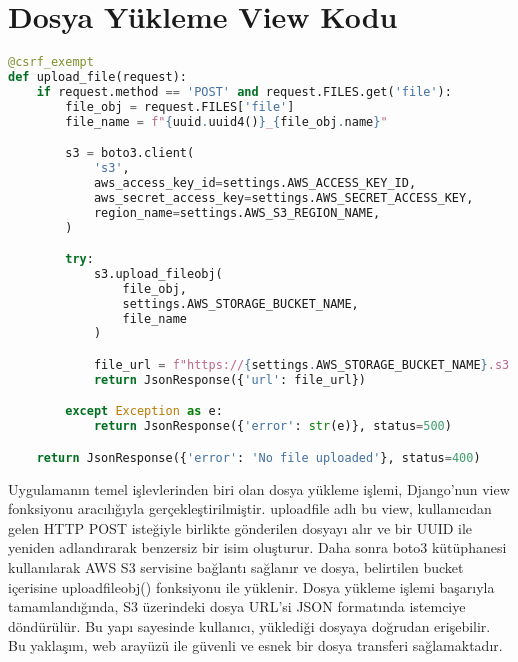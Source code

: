 \section{}
\section{Dosya Yükleme View Kodu}
\begin{lstlisting}[language=Python, caption=upload_file fonksiyonu]
@csrf_exempt
def upload_file(request):
    if request.method == 'POST' and request.FILES.get('file'):
        file_obj = request.FILES['file']
        file_name = f"{uuid.uuid4()}_{file_obj.name}"

        s3 = boto3.client(
            's3',
            aws_access_key_id=settings.AWS_ACCESS_KEY_ID,
            aws_secret_access_key=settings.AWS_SECRET_ACCESS_KEY,
            region_name=settings.AWS_S3_REGION_NAME,
        )

        try:
            s3.upload_fileobj(
                file_obj,
                settings.AWS_STORAGE_BUCKET_NAME,
                file_name
            )

            file_url = f"https://{settings.AWS_STORAGE_BUCKET_NAME}.s3.{settings.AWS_S3_REGION_NAME}.amazonaws.com/{file_name}"
            return JsonResponse({'url': file_url})

        except Exception as e:
            return JsonResponse({'error': str(e)}, status=500)

    return JsonResponse({'error': 'No file uploaded'}, status=400)
\end{lstlisting}

Uygulamanın temel işlevlerinden biri olan dosya yükleme işlemi, Django’nun view fonksiyonu aracılığıyla gerçekleştirilmiştir. uploadfile adlı bu view, kullanıcıdan gelen HTTP POST isteğiyle birlikte gönderilen dosyayı alır ve bir UUID ile yeniden adlandırarak benzersiz bir isim oluşturur. Daha sonra boto3 kütüphanesi kullanılarak AWS S3 servisine bağlantı sağlanır ve dosya, belirtilen bucket içerisine uploadfileobj() fonksiyonu ile yüklenir. Dosya yükleme işlemi başarıyla tamamlandığında, S3 üzerindeki dosya URL’si JSON formatında istemciye döndürülür. Bu yapı sayesinde kullanıcı, yüklediği dosyaya doğrudan erişebilir. Bu yaklaşım, web arayüzü ile güvenli ve esnek bir dosya transferi sağlamaktadır.

